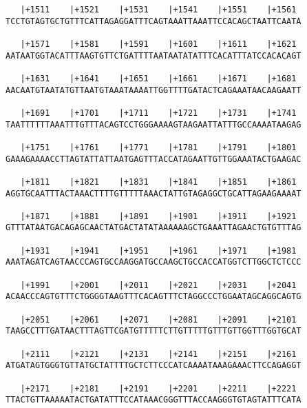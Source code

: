 \documentclass{article}
\begin{document}
\begin{Verbatim}
   |+1511    |+1521    |+1531    |+1541    |+1551    |+1561 
TCCTGTAGTGCTGTTTCATTAGAGGATTTCAGTAAATTAAATTCCACAGCTAATTCAATA
                                                            
   |+1571    |+1581    |+1591    |+1601    |+1611    |+1621 
AATAATGGTACATTTAAGTGTTCTGATTTTAATAATATATTTCACATTTATCCACACAGT
                                                            
   |+1631    |+1641    |+1651    |+1661    |+1671    |+1681 
AACAATGTAATATGTTAATGTAAATAAAATTGGTTTTGATACTCAGAAATAACAAGAATT
                                                            
   |+1691    |+1701    |+1711    |+1721    |+1731    |+1741 
TAATTTTTTAAATTTGTTTACAGTCCTGGGAAAAGTAAGAATTATTTGCCAAAATAAGAG
                                                            
   |+1751    |+1761    |+1771    |+1781    |+1791    |+1801 
GAAAGAAAACCTTAGTATTATTAATGAGTTTACCATAGAATTGTTGGAAATACTGAAGAC
                                                            
   |+1811    |+1821    |+1831    |+1841    |+1851    |+1861 
AGGTGCAATTTACTAAACTTTTGTTTTTAAACTATTGTAGAGGCTGCATTAGAAGAAAAT
                                                            
   |+1871    |+1881    |+1891    |+1901    |+1911    |+1921 
GTTTATAATGACAGAGCAACTATGACTATATAAAAAAGCTGAAATTAGAACTGTGTTTAG
                                                            
   |+1931    |+1941    |+1951    |+1961    |+1971    |+1981 
AAATAGATCAGTAACCCAGTGCCAAGGATGCCAAGCTGCCACCATGGTCTTGGCTCTCCC
                                                            
   |+1991    |+2001    |+2011    |+2021    |+2031    |+2041 
ACAACCCAGTGTTTCTGGGGTAAGTTTCACAGTTTCTAGGCCCTGGAATAGCAGGCAGTG
                                                            
   |+2051    |+2061    |+2071    |+2081    |+2091    |+2101 
TAAGCCTTTGATAACTTTAGTTCGATGTTTTTCTTGTTTTTGTTTGTTGGTTTGGTGCAT
                                                            
   |+2111    |+2121    |+2131    |+2141    |+2151    |+2161 
ATGATAGTGGGTGTTATGCTATTTTGCTCTTCCCATCAAAATAAAGAAACTTCCAGAGGT
                                                            
   |+2171    |+2181    |+2191    |+2201    |+2211    |+2221 
TTACTGTTAAAAATACTGATATTTCCATAAACGGGTTTACCAAGGGTGTAGTATTTCATA
                                                            

\end{Verbatim}
\end{document}
